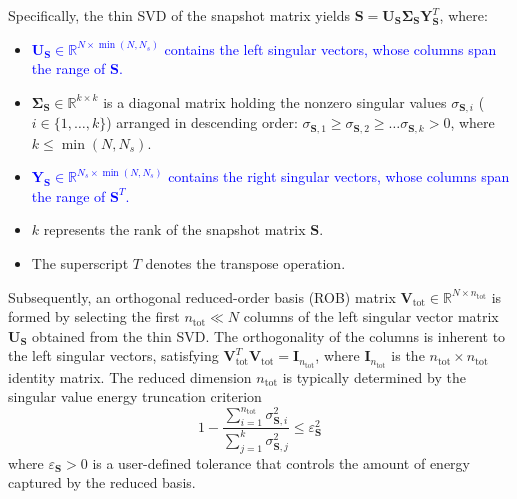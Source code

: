 \documentclass[preprint,10pt]{elsarticle}
\begin{document}
Specifically, the thin SVD of the snapshot matrix yields 
$\mathbf{S} = \mathbf{U}_{\mathbf{S}} \mathbf{\Sigma}_{\mathbf{S}} \mathbf{Y}_{\mathbf{S}}^T$, where:
\begin{itemize}
    \item \textcolor{blue}{$\mathbf{U}_{\mathbf{S}} \in \mathbb{R}^{N \times \min(N, N_s)}$ contains the left singular vectors, whose columns span the range of $\mathbf{S}$.}
    \item $\mathbf{\Sigma}_{\mathbf{S}} \in \mathbb{R}^{k \times k}$ is a diagonal matrix holding the nonzero singular values $\sigma_{\mathbf{S}, i}$ ($i \in \{1, \dots, k\}$) arranged in descending order: $\sigma_{\mathbf{S}, 1} \geq \sigma_{\mathbf{S}, 2} \geq \dots \sigma_{\mathbf{S}, k} > 0$, 
	    where $k \le \min(N, N_s)$.
    \item \textcolor{blue}{$\mathbf{Y}_{\mathbf{S}} \in \mathbb{R}^{N_s \times \min(N, N_s)}$ contains the right singular vectors, whose columns span the range of $\mathbf{S}^T$.}
    \item $k$ represents the rank of the snapshot matrix $\mathbf{S}$.
    \item The superscript $T$ denotes the transpose operation.
\end{itemize}

Subsequently, an orthogonal reduced-order basis (ROB) matrix $\mathbf{V}_\text{tot} \in \mathbb{R}^{N \times n_\text{tot}}$ is formed by selecting the first $n_\text{tot} \ll N$ columns of the left singular vector matrix $\mathbf{U}_{\mathbf{S}}$ obtained from the thin SVD. The orthogonality of the columns is 
inherent to the left singular vectors, satisfying $\mathbf{V}_\text{tot}^T \mathbf{V}_\text{tot} = \mathbf{I}_{n_\text{tot}}$, where $\mathbf{I}_{n_\text{tot}}$ is the $n_\text{tot} \times n_\text{tot}$ identity matrix. The reduced dimension $n_\text{tot}$ is typically determined by the singular value energy 
truncation criterion 
\begin{equation}
	1 - \frac{\sum\limits_{i = 1}^{n_\text{tot}} \sigma_{\mathbf{S}, i}^2}{\sum\limits_{j = 1}^k \sigma_{\mathbf{S}, j}^2} \leq \varepsilon_{\mathbf{S}}^2
\label{eq:singular_value_energy_criteria}
\end{equation}
where $\varepsilon_{\mathbf{S}} > 0$ is a user-defined tolerance that controls the amount of energy captured by the reduced basis.
\end{document}
